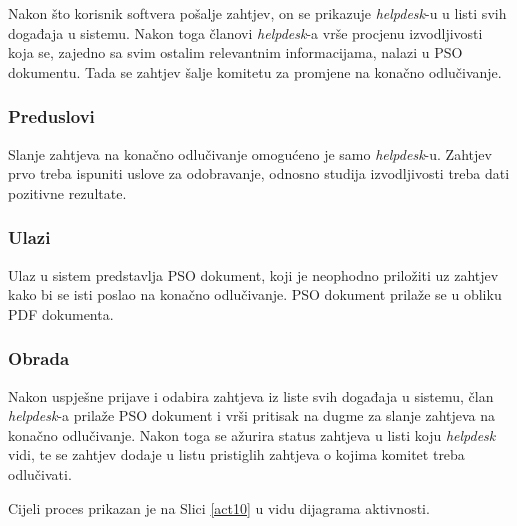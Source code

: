 \documentclass[12pt,a4paper]{article}
\begin{document}
Nakon što korisnik softvera pošalje zahtjev, on se prikazuje \textit{helpdesk}-u u listi svih događaja u sistemu. Nakon toga članovi \textit{helpdesk}-a vrše procjenu izvodljivosti koja se, zajedno sa svim ostalim relevantnim informacijama, nalazi u PSO dokumentu. Tada se zahtjev šalje komitetu za promjene na konačno odlučivanje.

\subsubsection{Preduslovi}

Slanje zahtjeva na konačno odlučivanje omogućeno je samo \textit{helpdesk}-u. Zahtjev prvo treba ispuniti uslove za odobravanje, odnosno studija izvodljivosti treba dati pozitivne rezultate.

\subsubsection{Ulazi}

Ulaz u sistem predstavlja PSO dokument, koji je neophodno priložiti uz zahtjev kako bi se isti poslao na konačno odlučivanje. PSO dokument prilaže se u obliku PDF dokumenta.

\subsubsection{Obrada}

Nakon uspješne prijave i odabira zahtjeva iz liste svih događaja u sistemu, član \textit{helpdesk}-a prilaže PSO dokument i vrši pritisak na dugme za slanje zahtjeva na konačno odlučivanje. Nakon toga se ažurira status zahtjeva u listi koju \textit{helpdesk} vidi, te se zahtjev dodaje u listu pristiglih zahtjeva o kojima komitet treba odlučivati.

Cijeli proces prikazan je na Slici \ref{act10} u vidu dijagrama aktivnosti.
\end{document}

